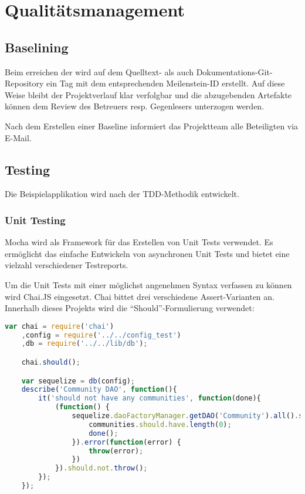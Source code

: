 \chapter{Qualitätsmanagement}
\label{sec:qualitymanagement}

\section{Baselining}
Beim erreichen der  wird auf dem Quelltext- als auch Dokumentations-Git-Repository ein Tag mit dem entsprechenden Meilenstein-ID erstellt. Auf diese Weise bleibt der Projektverlauf klar verfolgbar und die abzugebenden Artefakte können dem Review des Betreuers resp. Gegenlesers unterzogen werden.

Nach dem Erstellen einer Baseline informiert das Projektteam alle Beteiligten via E-Mail.

\section{Testing}
Die Beispielapplikation wird nach der \gls{TDD}-Methodik entwickelt.

\subsection{Unit Testing}
Mocha \cite{Mocha} wird als Framework für das Erstellen von Unit Tests verwendet. Es ermöglicht das einfache Entwickeln von asynchronen Unit Tests und bietet eine vielzahl verschiedener Testreports.

Um die Unit Tests mit einer möglichst angenehmen Syntax verfassen zu können wird Chai.JS \cite{ChaiJS} eingesetzt. Chai bittet drei verschiedene Assert-Varianten an. Innerhalb dieses Projekts wird die ``Should''-Formulierung verwendet:

\begin{lstlisting}[language=JavaScript, caption=Beispiel eines Unit Tests mit Mocha und Chai.js]
var chai = require('chai')
	,config = require('../../config_test')
	,db = require('../../lib/db');

	chai.should();

	var sequelize = db(config);
	describe('Community DAO', function(){
		it('should not have any communities', function(done){
			(function() {
				sequelize.daoFactoryManager.getDAO('Community').all().success(function(communities) {
					communities.should.have.length(0);
					done();
				}).error(function(error) {
					throw(error);
				})
			}).should.not.throw();
		});
	});
\end{lstlisting}

